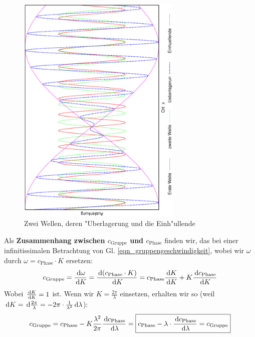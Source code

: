 \begin{figure}
   \centering
   \includegraphics[width=0.7\textwidth,angle=-90]{bilder/einhuell}
   \caption[Überlappung zweier Wellen]{Zwei Wellen, deren
     "Uberlagerung und die Einh"ullende}
   \label{abb_einhuell}
\end{figure}

\bigskip
Als \textbf{Zusammenhang zwischen $c_\text{Gruppe}$ und
  $c_\text{Phase}$} finden wir, das bei einer infinitissimalen
Betrachtung von Gl. \eqref{eqn_gruppengeschwindigkeit}, wobei wir
$\omega$ durch $\omega = c_\text{Phase} \cdot K$ ersetzen:
\begin{equation}
   \label{eq:167}
   c_\text{Gruppe} = \frac{\, \mathrm{d} \omega}{\, \mathrm{d} K} = \frac{\, \mathrm{d}
     (c_\text{Phase} \cdot K)}{\, \mathrm{d} K} = c_\text{Phase}\frac{\, \mathrm{d} K}{\, \mathrm{d} K}
   + K \frac{\, \mathrm{d} c_\text{Phase}}{\, \mathrm{d} K}
\end{equation}
Wobei $\frac{\, \mathrm{d} K}{\, \mathrm{d} K} = 1$ ist. Wenn wir $K =
\frac{2\pi}{\lambda}$  einsetzen, erhalten wir so (weil $\, \mathrm{d} K =
\, \mathrm{d} \frac{2\pi}{\lambda} = - 2\pi \cdot \frac{1}{\lambda^2} \, \mathrm{d}
\lambda$):
\begin{equation}
   \label{eq:169}
   c_\text{Gruppe} = c_\text{Phase} - K \frac{\lambda^2}{2\pi}
   \frac{\, \mathrm{d} c_\text{Phase}}{\, \mathrm{d} \lambda} 
=
\boxed{ c_\text{Phase} - \lambda \cdot \frac{\, \mathrm{d} c_\text{Phase}}{\, \mathrm{d}
  \lambda} = c_\text{Gruppe} }
\end{equation}




